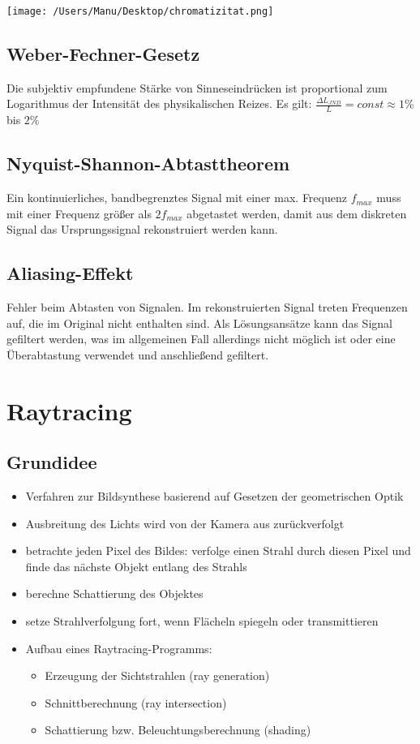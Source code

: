 \documentclass[paper=a4, fontsize=11pt]{scrartcl} %
\numberwithin{equation}{section} %
\numberwithin{figure}{section} %
\numberwithin{table}{section} %
\begin{document}
\texttt{[image: /Users/Manu/Desktop/chromatizitat.png]}

\subsection{Weber-Fechner-Gesetz}

Die subjektiv empfundene Stärke von Sinneseindrücken ist proportional zum Logarithmus der Intensität des physikalischen Reizes. Es gilt:
$\frac{\Delta L_{JND}}{L} = const \approx 1\%$ bis $2\%$

\subsection{Nyquist-Shannon-Abtasttheorem}

Ein kontinuierliches, bandbegrenztes Signal mit einer max. Frequenz $f_{max}$ muss mit einer Frequenz größer als $2 f_{max}$ abgetastet werden, damit aus dem diskreten Signal das Ursprungssignal rekonstruiert werden kann.

\subsection{Aliasing-Effekt}

Fehler beim Abtasten von Signalen. Im rekonstruierten Signal treten Frequenzen auf, die im Original nicht enthalten sind. Als Lösungsansätze kann das Signal gefiltert werden, was im allgemeinen Fall allerdings nicht möglich ist oder eine Überabtastung verwendet und anschließend gefiltert.

\section{Raytracing}

\subsection{Grundidee}
\begin{itemize}
\item Verfahren zur Bildsynthese basierend auf Gesetzen der geometrischen Optik
\item Ausbreitung des Lichts wird von der Kamera aus zurückverfolgt
\item betrachte jeden Pixel des Bildes: verfolge einen Strahl durch diesen Pixel und finde das nächste Objekt entlang des Strahls
\item berechne Schattierung des Objektes
\item setze Strahlverfolgung fort, wenn Flächeln spiegeln oder transmittieren
\item Aufbau eines Raytracing-Programms:
\begin{itemize}
\item Erzeugung der Sichtstrahlen (ray generation)
\item Schnittberechnung (ray intersection)
\item Schattierung bzw. Beleuchtungsberechnung (shading)
\end{itemize}
\end{itemize}
\newpage
\end{document}
